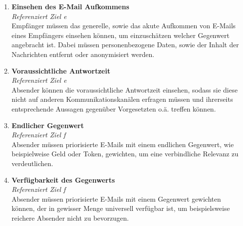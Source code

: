 \begin{enumerate}[label=(\alph*)]
    \item \textbf{Einsehen des E-Mail Aufkommens}\\
    \textit{Referenziert Ziel e} \\
        Empfänger müssen das generelle, sowie das akute Aufkommen von E-Mails eines Empfängers einsehen können, um einzuschätzen welcher Gegenwert angebracht ist. Dabei müssen personenbezogene Daten, sowie der Inhalt der Nachrichten entfernt oder anonymisiert werden. 
        
    \item \textbf{Voraussichtliche Antwortzeit}\\
    \textit{Referenziert Ziel e} \\
        Absender können die voraussichtliche Antwortzeit einsehen, sodass sie diese nicht auf anderen Kommunikationskanälen erfragen müssen und ihrerseits entsprechende Aussagen gegenüber Vorgesetzten o.ä. treffen können. 
        
    \item \textbf{Endlicher Gegenwert}\\
    \textit{Referenziert Ziel f} \\
        Absender müssen priorisierte E-Mails mit einem endlichen Gegenwert, wie beispielweise Geld oder Token, gewichten, um eine verbindliche Relevanz zu verdeutlichen.
        
    \item \textbf{Verfügbarkeit des Gegenwerts}\\
    \textit{Referenziert Ziel f} \\
        Absender müssen priorisierte E-Mails mit einem Gegenwert gewichten können, der in gewisser Menge universell verfügbar ist, um beispielsweise reichere Absender nicht zu bevorzugen.  
\end{enumerate}